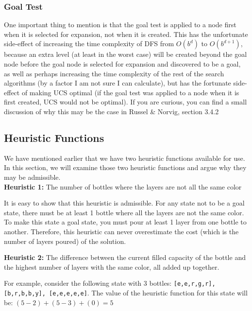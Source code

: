 \documentclass{article}
\begin{document}
\subsubsection{Goal Test}
One important thing to mention is that the goal test is applied to a node first when it is selected for expansion, not when it is created. This has the unfortunate side-effect of increasing the time complexity of DFS from $O(b^{d})$ to $O(b^{d+1})$, because an extra level (at least in the worst case) will be created beyond the goal node before the goal node is selected for expansion and discovered to be a goal, as well as perhaps increasing the time complexity of the rest of the search algorithms (by a factor I am not sure I can calculate), but has the fortunate side-effect of making UCS optimal (if the goal test was applied to a node when it is first created, UCS would not be optimal). If you are curious, you can find a small discussion of why this may be the case in Russel \& Norvig, section 3.4.2

\subsection{Heuristic Functions}

We have mentioned earlier that we have two heuristic functions available for use. In this section, we will examine those two heuristic functions and argue why they may be admissible. \\

\textbf{Heuristic 1: } The number of bottles where the layers are not all the same color

It is easy to show that this heuristic is admissible. For any state not to be a goal state, there must be at least 1 bottle where all the layers are not the same color. To make this state a goal state, you must pour at least 1 layer from one bottle to another. Therefore, this heuristic can never overestimate the cost (which is the number of layers poured) of the solution. \\

\newpage

\textbf{Heuristic 2: } The difference between the current filled capacity of the bottle and the highest number of layers with the same color, all added up together.

For example, consider the following state with 3 bottles: \texttt{[e,e,r,g,r], [b,r,b,b,y], [e,e,e,e,e]}. The value of the heuristic function for this state will be: $(5 - 2) + (5 - 3) + (0) = 5$ \\
\end{document}
